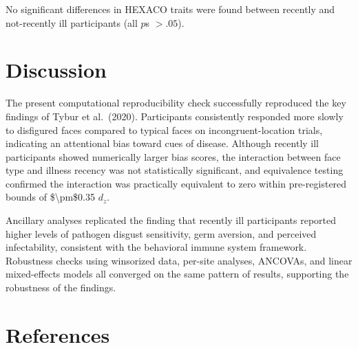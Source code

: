 \documentclass[
  english,
  man]{apa6}
\begin{document}
No significant differences in HEXACO traits were found between recently and not-recently ill participants (all \(p\)s \(> .05\)).

\section{Discussion}\label{discussion}

The present computational reproducibility check successfully reproduced the key findings of Tybur et al.~(2020).
Participants consistently responded more slowly to disfigured faces compared to typical faces on incongruent-location trials,
indicating an attentional bias toward cues of disease.
Although recently ill participants showed numerically larger bias scores, the interaction between face type and illness recency
was not statistically significant, and equivalence testing confirmed the interaction was practically equivalent to zero
within pre-registered bounds of \$\textbackslash pm\$0.35 \(d_z\).

Ancillary analyses replicated the finding that recently ill participants reported higher levels of pathogen disgust sensitivity,
germ aversion, and perceived infectability, consistent with the behavioral immune system framework.
Robustness checks using winsorized data, per-site analyses, ANCOVAs, and linear mixed-effects models
all converged on the same pattern of results, supporting the robustness of the findings.

\section{References}\label{references}

\protect{}\label{refs}
\end{document}
